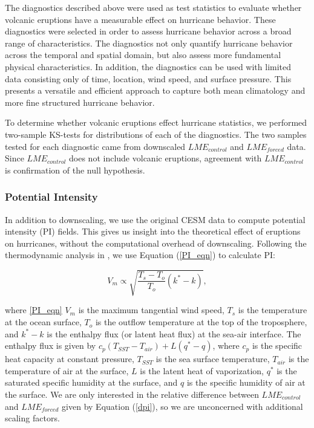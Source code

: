 \documentclass[smallextended]{svjour3}       %
\begin{document}
The diagnostics described above were used as test statistics to
evaluate whether volcanic eruptions have a measurable effect on
hurricane behavior. These diagnostics were selected in order to assess
hurricane behavior across a broad range of characteristics. The
diagnostics not only quantify hurricane behavior across the temporal
and spatial domain, but also assess more fundamental physical
characteristics. In addition, the diagnostics can be used with limited
data consisting only of time, location, wind speed, and surface
pressure. This presents a versatile and efficient approach to capture
both mean climatology and more fine structured hurricane behavior.

To determine whether volcanic eruptions effect hurricane statistics,
we performed two-sample KS-tests for distributions of each of the
diagnostics. The two samples tested for each diagnostic came from
downscaled $LME_{control}$ and $LME_{forced}$ data. Since
$LME_{control}$ does not include volcanic eruptions, agreement with
$LME_{control}$ is confirmation of the null hypothesis.

\subsubsection{Potential Intensity}
In addition to downscaling, we use the original CESM data to compute
potential intensity (PI) fields. This gives us insight into the
theoretical effect of eruptions on hurricanes, without the
computational overhead of downscaling. Following the thermodynamic
analysis in \cite{pi_ke}, we use Equation (\ref{PI_eqn}) to calculate
PI:

\begin{equation}
{V_m} \propto \sqrt{\frac{T_s-T_{o}}{T_{o}}(k^{*}-k)},
\label{PI_eqn}
\end{equation}

where \ref{PI_eqn} $V_m$ is the maximum tangential wind speed, $T_s$
is the temperature at the ocean surface, $T_o$ is the outflow
temperature at the top of the troposphere, and $k^{*}-k$ is the
enthalpy flux (or latent heat flux) at the sea-air interface. The
enthalpy flux is given by $c_p(T_{SST}-T_{air})+L(q^{*}-q)$, where
$c_p$ is the specific heat capacity at constant pressure, $T_{SST}$ is
the sea surface temperature, $T_{air}$ is the temperature of air at
the surface, $L$ is the latent heat of vaporization, $q^{*}$ is the
saturated specific humidity at the surface, and $q$ is the specific
humidity of air at the surface. We are only interested in the relative
difference between $LME_{control}$ and $LME_{forced}$ given by
Equation (\ref{dpi}), so we are unconcerned with additional scaling
factors.
\end{document}
